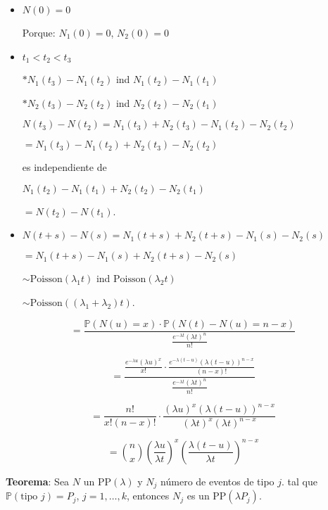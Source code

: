 \documentclass[12pt]{article}
\begin{document}
\begin{itemize}
    \item $N(0) = 0$
    
    Porque: $N_1(0) = 0$, $N_2(0) = 0$
    
    \item $t_1 < t_2 < t_3$
    
    $* N_1(t_3) - N_1(t_2)$ ind $N_1(t_2) - N_1(t_1)$
    
    $* N_2(t_3) - N_2(t_2)$ ind $N_2(t_2) - N_2(t_1)$
    
    $N(t_3) - N(t_2) = N_1(t_3) + N_2(t_3) - N_1(t_2) - N_2(t_2)$
    
    $= N_1(t_3) - N_1(t_2) + N_2(t_3) - N_2(t_2)$
    
    es independiente de
    
    $N_1(t_2) - N_1(t_1) + N_2(t_2) - N_2(t_1)$
    
    $= N(t_2) - N(t_1)$.
    
    \item $N(t+s) - N(s) = N_1(t+s) + N_2(t+s) - N_1(s) - N_2(s)$
    
    $= N_1(t+s) - N_1(s) + N_2(t+s) - N_2(s)$
    
    $\sim \text{Poisson}(\lambda_1 t)$ ind $\text{Poisson}(\lambda_2 t)$
    
    $\sim \text{Poisson}((\lambda_1 + \lambda_2)t)$.
\end{itemize}

\begin{equation*}
= \frac{\mathbb{P}(N(u) = x) \cdot \mathbb{P}(N(t) - N(u) = n - x)}{\frac{e^{-\lambda t} (\lambda t)^n}{n!}}
\end{equation*}

\begin{equation*}
= \frac{\frac{e^{-\lambda u} (\lambda u)^x}{x!} \cdot \frac{e^{-\lambda(t-u)} (\lambda(t-u))^{n-x}}{(n-x)!}}{\frac{e^{-\lambda t} (\lambda t)^n}{n!}}
\end{equation*}

\begin{equation*}
= \frac{n!}{x!(n-x)!} \cdot \frac{(\lambda u)^x (\lambda(t-u))^{n-x}}{(\lambda t)^x (\lambda t)^{n-x}}
\end{equation*}

\begin{equation*}
= \binom{n}{x} \left(\frac{\lambda u}{\lambda t}\right)^x \left(\frac{\lambda(t-u)}{\lambda t}\right)^{n-x}
\end{equation*}

\textbf{Teorema}: Sea $N$ un PP$(\lambda)$ y $N_j$ número de eventos de tipo $j$. tal que $\mathbb{P}(\text{tipo } j) = P_j$, $j = 1, \ldots, k$, entonces $N_j$ es un PP$(\lambda P_j)$.
\end{document}
